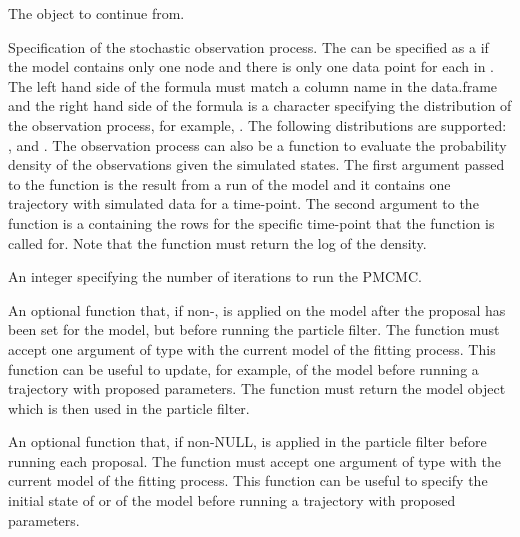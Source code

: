 \documentclass[letterpaper]{book}
\begin{document}
%
\begin{Arguments}
\begin{ldescription}
\item[\code{object}] The  object to continue from.

\item[\code{obs\_process}] Specification of the stochastic observation
process. The  can be specified as a
 if the model contains only one node and there
is only one data point for each  in .
The left hand side of the formula must match a column name in
the  data.frame and the right hand side of the
formula is a character specifying the distribution of the
observation process, for example, .
The following distributions are supported: ,  and . The observation process can also be a
function to evaluate the probability density of the
observations given the simulated states. The first argument
passed to the  function is the result from a
run of the model and it contains one trajectory with simulated
data for a time-point. The second argument to the
 function is a  containing
the rows for the specific time-point that the function is
called for. Note that the function must return the log of the
density.

\item[\code{n\_iterations}] An integer specifying the number of iterations
to run the PMCMC.

\item[\code{post\_proposal}] An optional function that, if
non-, is applied on the model after the proposal
has been set for the model, but before running the particle
filter. The function must accept one argument of type
 with the current model of the fitting
process. This function can be useful to update, for example,
 of the model before running a trajectory with
proposed parameters. The function must return the model object
which is then used in the particle filter.

\item[\code{init\_model}] An optional function that, if non-NULL, is
applied in the particle filter before running each
proposal. The function must accept one argument of type
 with the current model of the fitting
process. This function can be useful to specify the initial
state of  or  of the model before running a
trajectory with proposed parameters.


\end{ldescription}
\end{Arguments}
\end{document}
